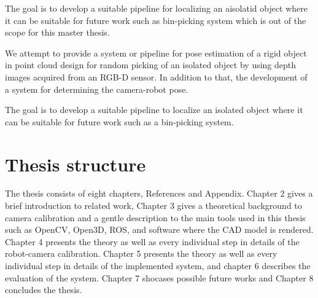 The goal is to develop a suitable pipeline for localizing an aisolatid object where it can be suitable for future work such as bin-picking system which is out of the scope for this master thesis.
\fi

We attempt to provide a system or pipeline for pose estimation of a rigid object in point cloud design for random picking of an isolated object by using depth images acquired from an RGB-D sensor. In addition to that, the development of a system for determining the camera-robot pose.

The goal is to develop a suitable pipeline to localize an isolated object where it can be suitable for future work such as a bin-picking system.


\section{Thesis structure}

The thesis consists of eight chapters, References and Appendix. Chapter 2 gives a brief introduction to related work, Chapter 3 gives a theoretical background to camera calibration and a gentle description to the main tools used in this thesis such as OpenCV, Open3D, ROS, and software where the CAD model is rendered. Chapter 4 presents the theory as well as every individual step in details of the robot-camera calibration. Chapter 5 presents the theory as well as every individual step in details of the implemented system, and chapter 6 describes the evaluation of the system. Chapter 7 shocases possible future works and Chapter 8 concludes the thesis. 

